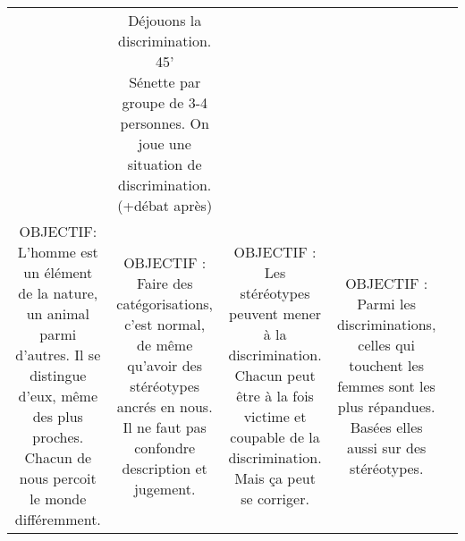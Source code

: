 \documentclass{article}
\begin{document}
\begin{tabular}{|c||c||c||c||c|}
   & \parbox[][4cm][c]{3.7cm}{Déjouons la discrimination. 45' \\ Sénette par groupe de 3-4 personnes. On joue une situation de discrimination. (+débat après)}
    
    &  
    
    &
   \\
  
   \parbox[][4cm][c]{3.7cm}{OBJECTIF: L'homme est un élément de la nature, un animal parmi d'autres. Il se distingue d'eux, même des plus proches. Chacun de nous percoit le monde différemment.}
   
   & 
   \parbox[][4cm][c]{3.7cm}{OBJECTIF : Faire des catégorisations, c'est normal, de même qu'avoir des stéréotypes ancrés en nous. Il ne faut pas confondre description et jugement.}
   
   & 
   \parbox[][4cm][c]{3.7cm}{OBJECTIF : Les stéréotypes peuvent mener à la discrimination. Chacun peut être à la fois victime et coupable de la discrimination. Mais ça peut se corriger.}

  &
  \parbox[][4cm][c]{3.7cm}{OBJECTIF : Parmi les discriminations, celles qui touchent les femmes sont les plus répandues. Basées elles aussi sur des stéréotypes.}
  
  &
   \\
   
\hline
    






   

   

  

\end{tabular}
\end{document}
